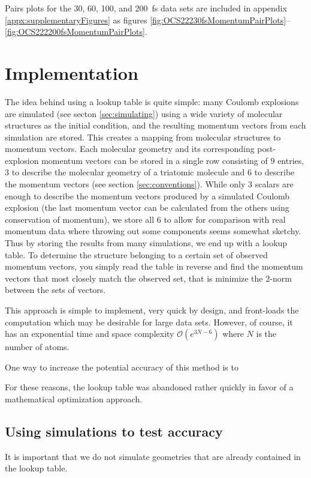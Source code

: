 Pairs plots for the 30, 60, 100, and \SI{200}{\fs} data sets are included in appendix \ref{appx:supplementaryFigures} as figures \ref{fig:OCS22230fsMomentumPairPlots}--\ref{fig:OCS222200fsMomentumPairPlots}.

\section{Implementation}
The idea behind using a lookup table is quite simple: many Coulomb explosions are simulated (see secton \ref{sec:simulating}) using a wide variety of molecular structures as the initial condition, and the resulting momentum vectors from each simulation are stored. This creates a mapping from molecular structures to momentum vectors. Each molecular geometry and its corresponding post-explosion momentum vectors can be stored in a single row consisting of $9$ entries, $3$ to describe the molecular geometry of a triatomic molecule and $6$ to describe the momentum vectors (see section \ref{sec:conventions}). While only $3$ scalars are enough to describe the momentum vectors produced by a simulated Coulomb explosion (the last momentum vector can be calculated from the others using conservation of momentum), we store all $6$ to allow for comparison with real momentum data where throwing out some components seems somewhat sketchy. Thus by storing the results from many simulations, we end up with a lookup table. To determine the structure belonging to a certain set of observed momentum vectors, you simply read the table in reverse and find the momentum vectors that most closely match the observed set, that is minimize the $2$-norm between the sets of vectors.

This approach is simple to implement, very quick by design, and front-loads the computation which may be desirable for large data sets. However, of course, it has an exponential time and space complexity $\mathcal{O}(e^{3N-6})$ where $N$ is the number of atoms.

One way to increase the potential accuracy of this method is to 

For these reasons, the lookup table was abandoned rather quickly in favor of a mathematical optimization approach.

\subsection{Using simulations to test accuracy}
It is important that we do not simulate geometries that are already contained in the lookup table.

